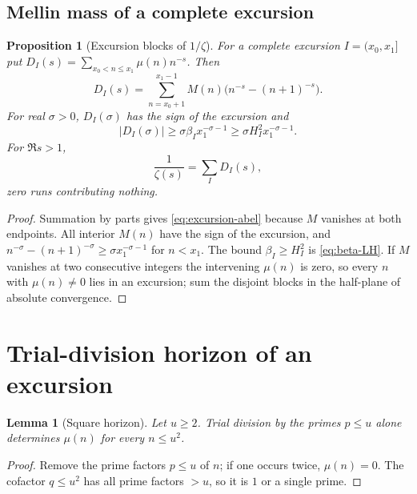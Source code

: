 \documentclass[11pt]{amsart}
\numberwithin{equation}{section}
\theoremstyle{plain}
\newtheorem{proposition}[theorem]{Proposition}
\newtheorem{lemma}[theorem]{Lemma}
\theoremstyle{definition}
\theoremstyle{remark}
\begin{document}
\subsection{Mellin mass of a complete excursion}

\begin{proposition}[Excursion blocks of $1/\zeta$]
\label{prop:excursion-mellin}
For a complete excursion $I=(x_0,x_1]$ put
$D_I(s)=\sum_{x_0<n\le x_1}\mu(n)n^{-s}$. Then
\begin{equation}
\label{eq:excursion-abel}
D_I(s)=\sum_{n=x_0+1}^{x_1-1}M(n)
\bigl(n^{-s}-(n+1)^{-s}\bigr).
\end{equation}
For real $\sigma>0$, $D_I(\sigma)$ has the sign of the excursion and
\begin{equation}
\label{eq:excursion-mass-lower}
|D_I(\sigma)|\ge
\sigma\beta_I x_1^{-\sigma-1}
\ge\sigma H_I^2x_1^{-\sigma-1}.
\end{equation}
For $\Re s>1$,
\begin{equation}
\label{eq:1overzeta-excursions}
\frac1{\zeta(s)}=\sum_I D_I(s),
\end{equation}
zero runs contributing nothing.
\end{proposition}

\begin{proof}
Summation by parts gives \eqref{eq:excursion-abel} because $M$ vanishes at
both endpoints. All interior $M(n)$ have the sign of the excursion, and
$n^{-\sigma}-(n+1)^{-\sigma}\ge\sigma x_1^{-\sigma-1}$ for $n<x_1$. The
bound $\beta_I\ge H_I^2$ is \eqref{eq:beta-LH}. If $M$ vanishes at two
consecutive integers the intervening $\mu(n)$ is zero, so every $n$ with
$\mu(n)\ne0$ lies in an excursion; sum the disjoint blocks in the
half-plane of absolute convergence.
\end{proof}

\section{Trial-division horizon of an excursion}
\label{sec:prime_horizon}

\begin{lemma}[Square horizon]
\label{lem:square-horizon}
Let $u\ge2$. Trial division by the primes $p\le u$ alone determines $\mu(n)$
for every $n\le u^2$.
\end{lemma}

\begin{proof}
Remove the prime factors $p\le u$ of $n$; if one occurs twice, $\mu(n)=0$.
The cofactor $q\le u^2$ has all prime factors $>u$, so it is $1$ or a single
prime.
\end{proof}
\end{document}
